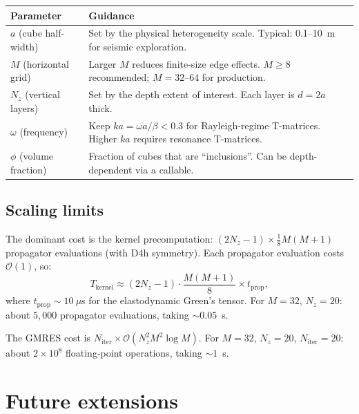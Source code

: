 \documentclass[11pt,a4paper]{article}
\newcommand{\order}{\mathcal{O}}
\begin{document}
\begin{center}
\renewcommand{\arraystretch}{1.3}
\begin{tabular}{lp{9cm}}
\toprule
\textbf{Parameter} & \textbf{Guidance} \\
\midrule
$a$ (cube half-width) &
  Set by the physical heterogeneity scale.  Typical: 0.1--10~m
  for seismic exploration. \\
$M$ (horizontal grid) &
  Larger $M$ reduces finite-size edge effects.  $M \geq 8$ recommended;
  $M = 32$--$64$ for production. \\
$N_z$ (vertical layers) &
  Set by the depth extent of interest.  Each layer is $d = 2a$ thick. \\
$\omega$ (frequency) &
  Keep $ka = \omega a / \beta < 0.3$ for Rayleigh-regime T-matrices.
  Higher $ka$ requires resonance T-matrices. \\
$\phi$ (volume fraction) &
  Fraction of cubes that are ``inclusions''.  Can be depth-dependent
  via a callable. \\
\bottomrule
\end{tabular}
\end{center}

\subsection{Scaling limits}

The dominant cost is the kernel precomputation:
$(2N_z - 1) \times \tfrac{1}{8}M(M+1)$ propagator evaluations
(with D4h symmetry).  Each propagator evaluation costs
$\order(1)$, so:
\begin{equation}
  T_{\text{kernel}} \approx (2N_z - 1) \cdot \frac{M(M+1)}{8}
    \times t_{\text{prop}},
\end{equation}
where $t_{\text{prop}} \sim 10~\mu$s for the elastodynamic
Green's tensor.  For $M = 32$, $N_z = 20$: about $5{,}000$
propagator evaluations, taking $\sim\!0.05$~s.

The GMRES cost is $N_{\text{iter}} \times \order(N_z^2 M^2 \log M)$.
For $M = 32$, $N_z = 20$, $N_{\text{iter}} = 20$: about
$2 \times 10^8$ floating-point operations, taking $\sim\!1$~s.

\section{Future extensions}
\label{sec:future}
\end{document}
